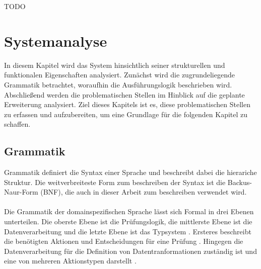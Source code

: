     TODO
    \newpage
    \chapter{Systemanalyse}
    In diesem Kapitel wird das System hinsichtlich seiner strukturellen und funktionalen Eigenschaften analysiert. 
    Zunächst wird die zugrundeliegende Grammatik betrachtet, woraufhin die Ausführungslogik beschrieben wird. Abschließend werden die problematischen Stellen im Hinblick auf die geplante Erweiterung analysiert.
    Ziel dieses Kapitels ist es, diese problematischen Stellen zu erfassen und aufzubereiten, um eine Grundlage für die folgenden Kapitel zu schaffen.\\
    \section{Grammatik}
    \label{Grammatik}
    Grammatik definiert die Syntax einer Sprache und beschreibt dabei die hierariche Struktur.
    Die weitverbreiteste Form zum beschreiben der Syntax ist die Backus-Naur-Form (BNF), die auch in dieser Arbeit zum beschreiben verwendet wird.\\
    \\
    Die Grammatik der domainspezifischen Sprache lässt sich Formal in drei Ebenen unterteilen. 
    Die oberste Ebene ist die Prüfungslogik, die mittlerste Ebene ist die Datenverarbeitung und die letzte Ebene ist das Typsystem \cite{99}.
    Ersteres beschreibt die benötigten Aktionen und Entscheidungen für eine Prüfung \cite{99}.
    Hingegen die Datenverarbeitung für die Definition von Datentranformationen zuständig ist und eine von mehreren Aktionstypen darstellt \cite{99}.
